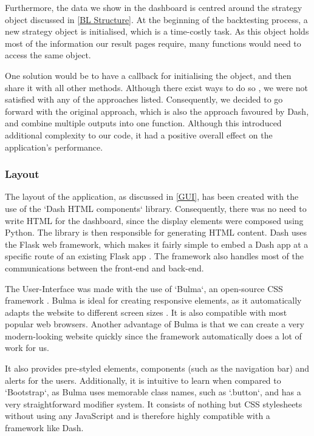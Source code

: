 \documentclass[main.tex]{subfiles}
\begin{document}
Furthermore, the data we show in the dashboard is centred around the strategy object discussed in \ref{BL Structure}. At the beginning of the backtesting process, a new strategy object is initialised, which is a time-costly task. As this object holds most of the information our result pages require, many functions would need to access the same object. 

One solution would be to have a callback for initialising the object, and then share it with all other methods. Although there exist ways to do so \cite{dash_share}, we were not satisfied with any of the approaches listed. Consequently, we decided to go forward with the original approach, which is also the approach favoured by Dash, and combine multiple outputs into one function. Although this introduced additional complexity to our code, it had a positive overall effect on the application's performance.

\subsubsection*{Layout}

The layout of the application, as discussed in \ref{GUI}, has been created with the use of the `Dash HTML components` library. Consequently, there was no need to write HTML for the dashboard, since the display elements were composed using Python. The library is then responsible for generating HTML content. Dash uses the Flask web framework, which makes it fairly simple to embed a Dash app at a specific route of an existing Flask app \cite{flask-dash}. The framework also handles most of the communications between the front-end and back-end.

The User-Interface was made with the use of `Bulma`, an open-source CSS framework \cite{bulma}. Bulma is ideal for creating responsive elements, as it automatically adapts the website to different screen sizes \cite{responsiveness_2020}. It is also compatible with most popular web browsers. Another advantage of Bulma is that we can create a very modern-looking website quickly since the framework automatically does a lot of work for us.

It also provides pre-styled elements, components (such as the navigation bar) and alerts for the users. Additionally, it is intuitive to learn when compared to `Bootstrap`, as Bulma uses memorable class names, such as `.button`, and has a very straightforward modifier system. It consists of nothing but CSS stylesheets without using any JavaScript and is therefore highly compatible with a framework like Dash.
\end{document}
